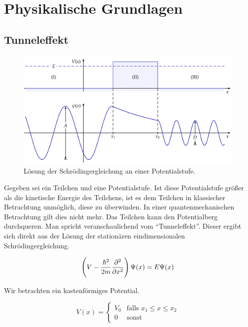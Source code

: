\documentclass[a4paper,german,12pt,smallheadings]{scrartcl}
\begin{document}


\begin{titlepage}

\end{titlepage}

\allowdisplaybreaks %

\section{Physikalische Grundlagen}
\subsection{Tunneleffekt}

\begin{figure}[h!]
  \centering
  \includegraphics[width=1.0 \textwidth]{pic2.png}
  \caption{Lösung der Schrödingergleichung an einer Potentialstufe.\citep{pic2}}
\end{figure}

Gegeben sei ein Teilchen und eine Potentialstufe. Ist diese Potentialstufe
größer als die kinetische Energie des Teilchens, ist es dem Teilchen in
klassischer Betrachtung unmöglich, diese zu überwinden. In einer
quantenmechanischen Betrachtung gilt dies nicht mehr. Das Teilchen kann den
Potentialberg durchqueren. Man spricht veranschaulichend vom ``Tunneleffekt''.
Dieser ergibt sich direkt aus der Lösung der stationären eindimensionalen
Schrödingergleichung.

\begin{equation}
  \del{V - \frac{\hbar^2}{2m} \frac{\partial^2}{\partial x^2}} \Psi(x) = E \Psi(x)
\end{equation}

Wir betrachten ein kastenförmiges Potential.

\begin{equation}
  V(x) = \begin{cases} V_0 & \text{falls } x_1 \le x \le x_2 \\ 0 & \text{sonst} \end{cases}
\end{equation}
\end{document}
